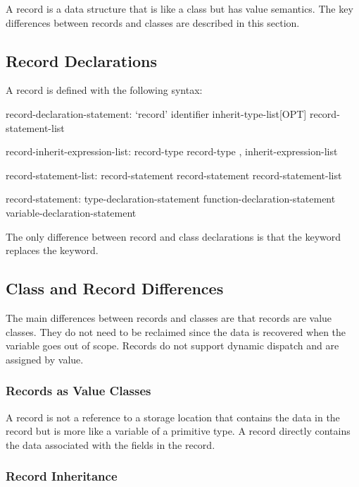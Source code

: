 \label{Records}

A record is a data structure that is like a class but has value
semantics.  The key differences between records and classes are
described in this section.

\subsection{Record Declarations}
\label{Record_Declarations}

A record is defined with the following syntax:
\begin{syntax}
record-declaration-statement:
  `record' identifier inherit-type-list[OPT] {
    record-statement-list }

record-inherit-expression-list:
  record-type
  record-type , inherit-expression-list

record-statement-list:
  record-statement
  record-statement record-statement-list

record-statement:
  type-declaration-statement
  function-declaration-statement
  variable-declaration-statement
\end{syntax}
The only difference between record and class declarations is that
the  keyword replaces the  keyword.

\subsection{Class and Record Differences}
\label{Class_and_Record_Differences}

The main differences between records and classes are that records are
value classes.  They do not need to be reclaimed since the data is
recovered when the variable goes out of scope.  Records do not support
dynamic dispatch and are assigned by value.

\subsubsection{Records as Value Classes}
\label{Records_as_Value_Classes}

A record is not a reference to a storage location that contains the
data in the record but is more like a variable of a primitive type.  A
record directly contains the data associated with the fields in the
record.

\subsubsection{Record Inheritance}
\label{Record_Inheritance}

